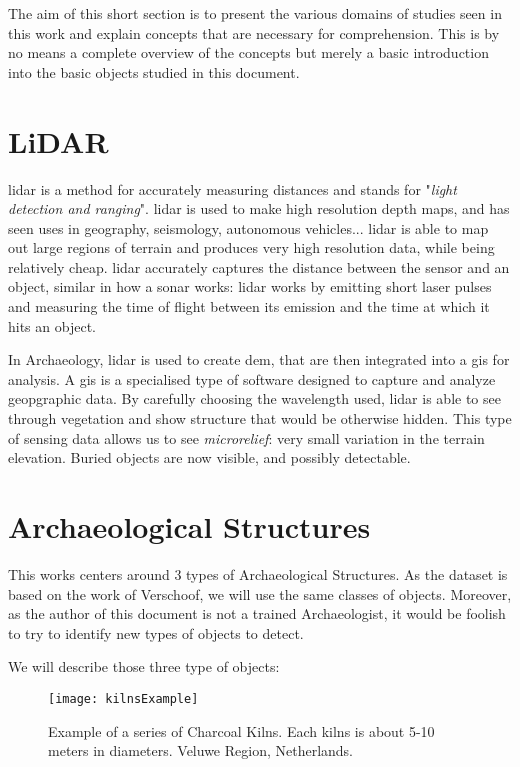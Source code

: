 The aim of this short section is to present the various domains of studies seen in this work and explain concepts that are necessary for comprehension. This is by no means a complete overview of the concepts but merely a basic introduction into the basic objects studied in this document. 

\section{LiDAR}
\gls{lidar} is a method for accurately measuring distances and stands for "\textit{light detection and ranging}". \gls{lidar} is used to make high resolution depth maps, and has seen uses in geography, seismology, autonomous vehicles\cite{WehrLohr1999}...  \gls{lidar} is able to map out large regions of terrain and produces very high resolution data, while being relatively cheap. \gls{lidar} accurately captures the distance between the sensor and an object, similar in how a sonar works: \gls{lidar} works by emitting short laser pulses and measuring the time of flight between its emission and the time at which it hits an object.  

In Archaeology, \gls{lidar} is used to create \gls{dem}, that are then integrated into a \gls{gis} for analysis. A \gls{gis} is a specialised type of software designed to capture and analyze geopgraphic data. By carefully choosing the wavelength used, \gls{lidar} is able to see through vegetation and show structure that would be otherwise hidden. This type of sensing data allows us to see \textit{microrelief}: very small variation in the terrain elevation. Buried objects are now visible, and possibly detectable.  

\section{Archaeological Structures}\label{elemArchaeo}
This works centers around 3 types of Archaeological Structures. As the dataset is based on the work of Verschoof\cite{wouter2019}, we will use the same classes of objects. Moreover, as the author of this document is not a trained Archaeologist, it would be foolish to try to identify new types of objects to detect. 

We will describe those three type of objects:
\begin{figure}[H]
  \centering
\texttt{[image: kilnsExample]}
	\caption[Charcoal Kilns]{Example of a series of Charcoal Kilns. Each kilns is about 5-10 meters in diameters. Veluwe Region, Netherlands.}
  \label{fig:kilnsExample}
\end{figure}

